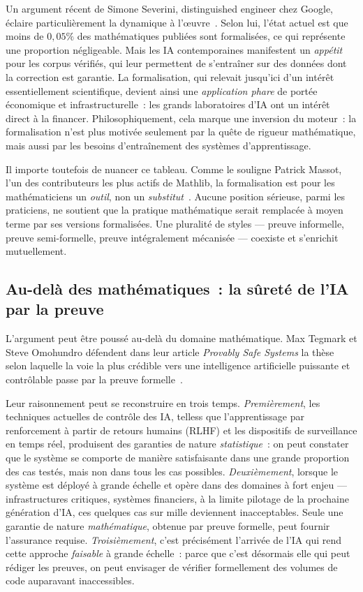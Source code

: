 \documentclass[11pt,a4paper]{article}
\begin{document}
Un argument récent de Simone Severini, distinguished engineer chez Google, éclaire particulièrement la dynamique à l'œuvre~\parencite{severini2026infrastructure}. Selon lui, l'état actuel est que moins de $0{,}05\%$ des mathématiques publiées sont formalisées, ce qui représente une proportion négligeable. Mais les IA contemporaines manifestent un \emph{appétit} pour les corpus vérifiés, qui leur permettent de s'entraîner sur des données dont la correction est garantie. La formalisation, qui relevait jusqu'ici d'un intérêt essentiellement scientifique, devient ainsi une \emph{application phare} de portée économique et infrastructurelle~: les grands laboratoires d'IA ont un intérêt direct à la financer. Philosophiquement, cela marque une inversion du moteur~: la formalisation n'est plus motivée seulement par la quête de rigueur mathématique, mais aussi par les besoins d'entraînement des systèmes d'apprentissage.

Il importe toutefois de nuancer ce tableau. Comme le souligne Patrick Massot, l'un des contributeurs les plus actifs de Mathlib, la formalisation est pour les mathématiciens un \emph{outil}, non un \emph{substitut}~\parencite{massotWhyFormalizeMathematics}. Aucune position sérieuse, parmi les praticiens, ne soutient que la pratique mathématique serait remplacée à moyen terme par ses versions formalisées. Une pluralité de styles --- preuve informelle, preuve semi-formelle, preuve intégralement mécanisée --- coexiste et s'enrichit mutuellement.

\subsection{Au-delà des mathématiques~: la sûreté de l'IA par la preuve}

L'argument peut être poussé au-delà du domaine mathématique. Max Tegmark et Steve Omohundro défendent dans leur article \emph{Provably Safe Systems} la thèse selon laquelle la voie la plus crédible vers une intelligence artificielle puissante et contrôlable passe par la preuve formelle~\parencite{tegmark2023provably}.

Leur raisonnement peut se reconstruire en trois temps. \textit{Premièrement}, les techniques actuelles de contrôle des IA, telless que l'apprentissage par renforcement à partir de retours humains (RLHF) et les dispositifs de surveillance en temps réel, produisent des garanties de nature \emph{statistique}~: on peut constater que le système se comporte de manière satisfaisante dans une grande proportion des cas testés, mais non dans tous les cas possibles. \textit{Deuxièmement}, lorsque le système est déployé à grande échelle et opère dans des domaines à fort enjeu --- infrastructures critiques, systèmes financiers, à la limite pilotage de la prochaine génération d'IA, ces quelques cas sur mille deviennent inacceptables. Seule une garantie de nature \emph{mathématique}, obtenue par preuve formelle, peut fournir l'assurance requise. \textit{Troisièmement}, c'est précisément l'arrivée de l'IA qui rend cette approche \emph{faisable} à grande échelle~: parce que c'est désormais elle qui peut rédiger les preuves, on peut envisager de vérifier formellement des volumes de code auparavant inaccessibles.
\end{document}

